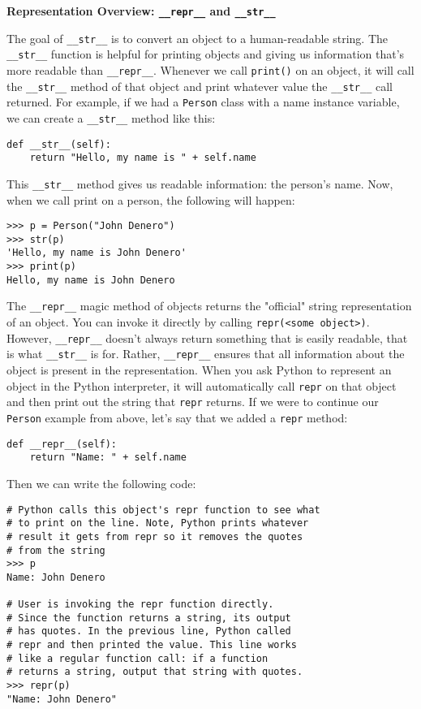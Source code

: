\textbf{Representation Overview: \lstinline{__repr__} and \lstinline{__str__}}

The goal of \lstinline{__str__} is to convert an object to a human-readable string. The \lstinline{__str__} function is helpful for printing objects and giving us information that's more readable than \lstinline{__repr__}. Whenever we call \lstinline{print()} on an object, it will call the \lstinline{__str__} method of that object and print whatever value the \lstinline{__str__} call returned. For example, if we had a \lstinline{Person} class with a name instance variable, we can create a \lstinline{__str__} method like this:
\begin{lstlisting}
def __str__(self):
    return "Hello, my name is " + self.name
\end{lstlisting}
This \lstinline{__str__} method gives us readable information: the person's name. Now, when we call print on a person, the following will happen:
\begin{lstlisting}
>>> p = Person("John Denero")
>>> str(p)
'Hello, my name is John Denero'
>>> print(p)              
Hello, my name is John Denero
\end{lstlisting}

The \lstinline{__repr__} magic method of objects returns the "official" string representation of an object. You can invoke it directly by calling \lstinline{repr(<some object>)}. However, \lstinline{__repr__} doesn't always return something that is easily readable, that is what \lstinline{__str__} is for. Rather, \lstinline{__repr__} ensures that all information about the object is present in the representation. When you ask Python to represent an object in the Python interpreter, it will automatically call \lstinline{repr} on that object and then print out the string that \lstinline{repr} returns. If we were to continue our \lstinline{Person} example from above, let's say that we added a \lstinline{repr} method:

\begin{lstlisting}
def __repr__(self):
    return "Name: " + self.name
\end{lstlisting}

Then we can write the following code:

\begin{lstlisting}
# Python calls this object's repr function to see what
# to print on the line. Note, Python prints whatever 
# result it gets from repr so it removes the quotes
# from the string
>>> p 
Name: John Denero

# User is invoking the repr function directly.
# Since the function returns a string, its output
# has quotes. In the previous line, Python called
# repr and then printed the value. This line works 
# like a regular function call: if a function 
# returns a string, output that string with quotes.
>>> repr(p) 
"Name: John Denero"
\end{lstlisting}


